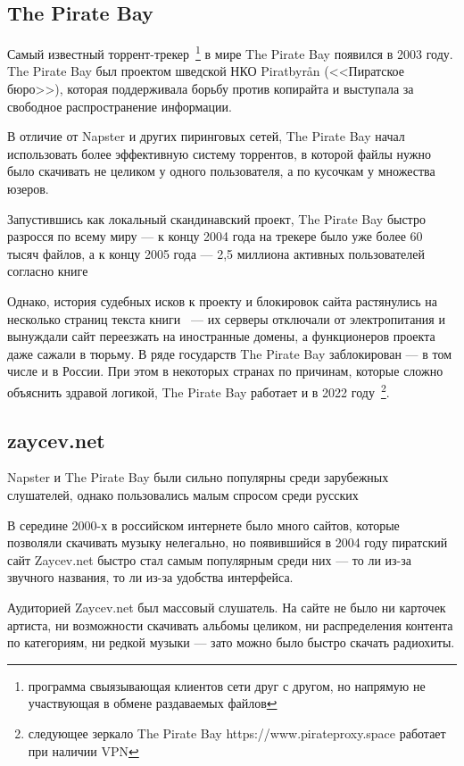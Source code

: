 \subsection{The Pirate Bay}

Самый известный торрент-трекер~\footnote{программа свыязывающая клиентов сети друг с другом, но напрямую не участвующая в обмене раздаваемых файлов} в мире The Pirate Bay появился в 2003 году. The Pirate Bay был проектом шведской НКО Piratbyrån ({}<<Пиратское бюро>>{}), которая поддерживала борьбу против копирайта и выступала за свободное распространение информации.

В отличие от Napster и других пиринговых сетей, The Pirate Bay начал использовать более эффективную систему торрентов, в которой файлы нужно было скачивать не целиком у одного пользователя, а по кусочкам у множества юзеров.

Запустившись как локальный скандинавский проект, The Pirate Bay быстро разросся по всему миру --- к концу 2004 года на трекере было уже более 60 тысяч файлов, а к концу 2005 года --- 2,5 миллиона активных пользователей согласно книге~\cite{piracy}

Однако, история судебных исков к проекту и блокировок сайта растянулись на несколько страниц текста книги~\cite{piracy} --- их серверы отключали от электропитания и вынуждали сайт переезжать на иностранные домены, а функционеров проекта даже сажали в тюрьму. В ряде государств The Pirate Bay заблокирован --- в том числе и в России. При этом в некоторых странах по причинам, которые сложно объяснить здравой логикой, The Pirate Bay работает и в 2022 году~\footnote{следующее зеркало The Pirate Bay https://www.pirateproxy.space работает при наличии VPN}.

\subsection{zaycev.net}

Napster и The Pirate Bay были сильно популярны среди зарубежных слушателей, однако пользовались малым спросом среди русских

В середине 2000-х в российском интернете было много сайтов, которые позволяли скачивать музыку нелегально, но появившийся в 2004 году пиратский сайт Zaycev.net быстро стал самым популярным среди них --- то ли из-за звучного названия, то ли из-за удобства интерфейса.

Аудиторией Zaycev.net был массовый слушатель. На сайте не было ни карточек артиста, ни возможности скачивать альбомы целиком, ни распределения контента по категориям, ни редкой музыки --- зато можно было быстро скачать радиохиты.

